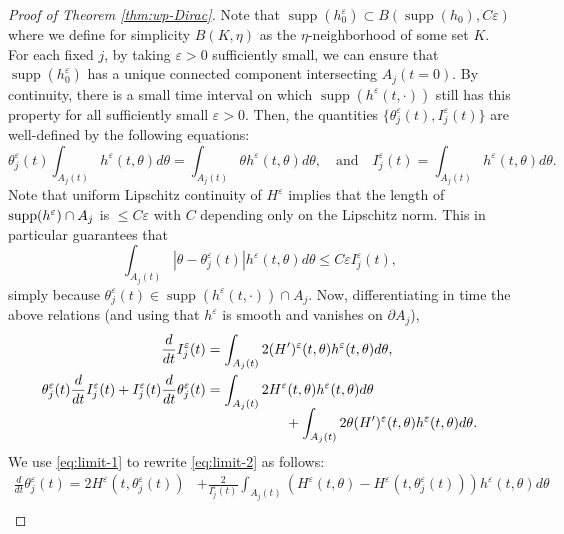 \documentclass[JEP,XML,SOM,Unicode,NoFloatCountersInSection,published]{cedram}
\theoremstyle{plain}
\theoremstyle{definition}
\DeclareMathOperator{\supp}{supp}
\let\tht\theta
\let\varep\varepsilon
\begin{document}
\begin{proof}[Proof of Theorem \ref{thm:wp-Dirac}]
Note that $\supp(h_0^{\varep}) \subset B(\supp(h_0), C\varep)$ where we define for simplicity $B(K,\eta)$ as the $\eta$-neighborhood of some set $K$. For each fixed $j$, by taking $\varep>0$ sufficiently small, we can ensure that $\supp(h_0^{\varep})$ has a unique connected component intersecting $A_{j}(t=0)$. By continuity, there is a small time interval on which $\supp(h^\varep(t,\cdot))$ still has this property for all sufficiently small $\varep>0$. Then, the quantities $\{ \tht_{j}^\varep(t), I_{j}^{\varep}(t) \}$ are well-defined by the following equations:\vspace*{-3pt}
\begin{equation*}
\tht_{j}^{\varep}(t) \int_{A_{j}(t)} h^\varep(t,\tht) d\tht = \int_{A_{j}(t)} \tht h^\varep(t,\tht) d\tht, \quad \mbox{and} \quad I_{j}^{\varep}(t) = \int_{A_{j}(t)} h^\varep(t,\tht) d\tht.
\end{equation*}
Note that uniform Lipschitz continuity of $H^\varep$ implies that the length of $\supp(h^\varep)\cap\nobreak A_{j}$ is $\le C\varep$ with $C$ depending only on the Lipschitz norm. This in particular guarantees that\vspace*{-3pt}
\begin{equation*}
\int_{A_j(t)} |\tht - \tht_{j}^{\varep}(t)| h^\varep(t,\tht) d\tht \le C\varep I_{j}^{\varep}(t),
\end{equation*}
simply because $\tht_{j}^{\varep}(t) \in \supp(h^\varep(t,\cdot)) \cap A_{j}$.
Now, differentiating in time the above relations (and using that $h^\varep$ is smooth and vanishes on $\partial A_{j}$),\vspace*{-3pt}
\begin{align}\label{eq:limit-1}
\frac{d}{dt} I_{j}^{\varep}(t) &= \int_{A_{j}(t)} 2 (H')^\varep(t,\tht) h^\varep(t,\tht) d\tht,
\\
\label{eq:limit-2}
\tht_{j}^{\varep}(t)\frac{d}{dt} I_{j}^{\varep}(t) +I_{j}^{\varep}(t) \frac{d}{dt} \tht_{j}^{\varep}(t)&= \int_{A_{j}(t)} 2 H^\varep(t,\tht) h^\varep(t,\tht) d\tht\\[-5pt]
&\hspace*{2cm}+ \int_{A_{j}(t)} 2\tht (H')^\varep(t,\tht) h^\varep(t,\tht) d\tht.\notag
\end{align}
We use \eqref{eq:limit-1} to rewrite \eqref{eq:limit-2} as follows:
\begin{equation*}
\begin{split}
\frac{d}{dt} \tht_{j}^{\varep}(t) = 2H^\varep(t, \tht_{j}^{\varep}(t)) &+ \frac{2}{I_{j}^{\varep}(t) } \int_{A_{j}(t)} (H^\varep(t,\tht) - H^\varep(t,\tht_{j}^{\varep}(t))) h^\varep(t,\tht) d\tht \\

\end{split}
\end{equation*}
\end{proof}
\end{document}
